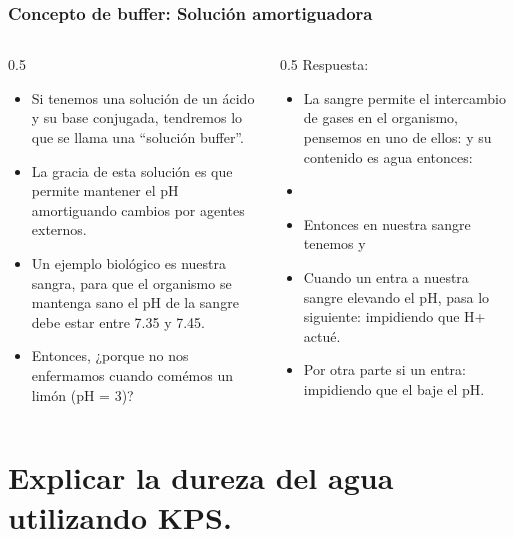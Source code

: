 \documentclass[11pt, aspectratio=169, xcolor=table]{beamer}
\begin{document}
\begin{frame}
  \frametitle{Concepto de buffer: Solución amortiguadora}
  \begin{columns}
    \begin{column}{0.5\textwidth}
      \begin{itemize}[<+->]
        \item Si tenemos una solución de un ácido y su base conjugada, tendremos lo que se llama una ``solución buffer''.
        \item La gracia de esta solución es que permite mantener el pH amortiguando cambios por agentes externos.
        \item Un ejemplo biológico es nuestra sangra, para que el organismo se mantenga sano el pH de la sangre debe estar entre 7.35 y 7.45.
        \item Entonces, ¿porque no nos enfermamos cuando comémos un limón (pH = 3)?
      \end{itemize}
    \end{column}
    \begin{column}{0.5\textwidth}
      Respuesta:
      \begin{itemize}[<+->]
        \footnotesize
        \item La sangre permite el intercambio de gases en el organismo, pensemos en uno de ellos:  y su contenido es agua entonces:
        \item {}
        \item Entonces en nuestra sangre tenemos  y 
        \item Cuando un  entra a nuestra sangre elevando el pH, pasa lo siguiente:  impidiendo que H+ actué.
        \item Por otra parte si un  entra:  impidiendo que el  baje el pH.
      \end{itemize}
    \end{column}
  \end{columns}
\end{frame}

\section{Explicar la dureza del agua utilizando KPS.}
\end{document}
